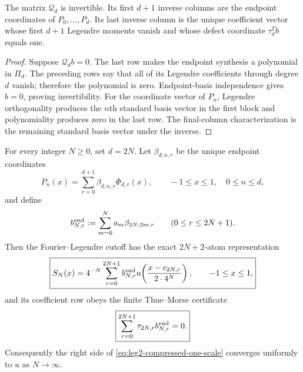 \begin{theorem}
\label{thm:leg2-augmented-moment}
The matrix $\mathcal Q_d$ is invertible.  Its first $d+1$ inverse columns are
the endpoint coordinates of $P_0,\ldots,P_d$.  Its last inverse column is the
unique coefficient vector whose first $d+1$ Legendre moments vanish and whose
defect coordinate $\tau_d^Tb$ equals one.
\end{theorem}

\begin{proof}
Suppose $\mathcal Q_db=0$.  The last row makes the endpoint synthesis a
polynomial in $\Pi_d$.  The preceding rows say that all of its Legendre
coefficients through degree $d$ vanish; therefore the polynomial is zero.
Endpoint-basis independence gives $b=0$, proving invertibility.  For the
coordinate vector of $P_n$, Legendre orthogonality produces the $n$th standard
basis vector in the first block and polynomiality produces zero in the last
row.  The final-column characterization is the remaining standard basis
vector under the inverse.
\end{proof}

\begin{theorem}
\label{thm:leg2-compressed-one-scale}
For every integer $N\ge0$, set $d=2N$.  Let $\beta_{d;n,r}$ be the unique endpoint
coordinates
\begin{equation}
 P_n(x)=\sum_{r=0}^{d+1}\beta_{d;n,r}\Phi_{d,r}(x),
 \qquad -1\le x\le1,\quad 0\le n\le d,
 \label{eq:leg2-beta-endpoint}
\end{equation}
and define
\begin{equation}
 b_{N,r}^{\rm end}:=\sum_{m=0}^{N}a_m\beta_{2N;2m,r}
 \qquad(0\le r\le2N+1).
 \label{eq:leg2-BNr}
\end{equation}
Then the Fourier--Legendre cutoff has the exact $2N+2$-atom representation
\begin{equation}
 \boxed{
 S_N(x)=4^{-N}\sum_{r=0}^{2N+1}b_{N,r}^{\rm end}
 u\!\left(
 \frac{x-c_{2N,r}}{2\cdot4^N}
 \right),
 \qquad -1\le x\le1,}
 \label{eq:leg2-compressed-one-scale}
\end{equation}
and its coefficient row obeys the finite Thue--Morse certificate
\begin{equation}
 \boxed{\sum_{r=0}^{2N+1}\tau_{2N,r}b_{N,r}^{\rm end}=0.}
 \label{eq:leg2-BN-certificate}
\end{equation}
Consequently the right side of \eqref{eq:leg2-compressed-one-scale} converges
uniformly to $u$ as $N\to\infty$.
\end{theorem}

